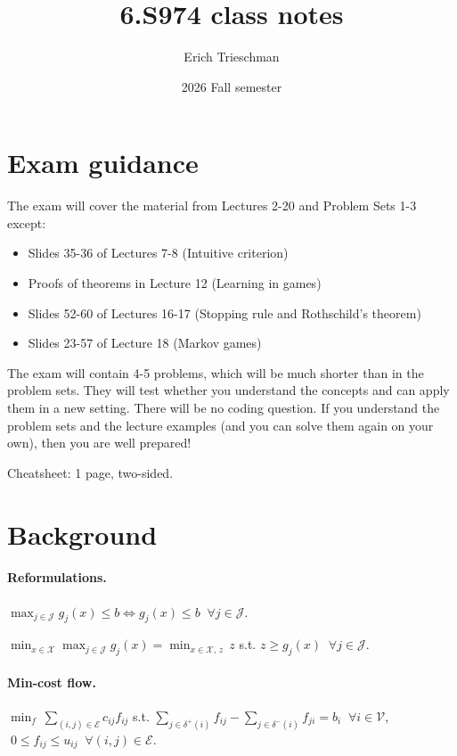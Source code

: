 \documentclass{article}
\title{6.S974 class notes}
\author{Erich Trieschman}
\date{2026 Fall semester}
\begin{document}
\maketitle
\tableofcontents

\section*{Exam guidance}
The exam will cover the material from Lectures 2-20 and Problem Sets 1-3 except:
\begin{itemize}
    \item Slides 35-36 of Lectures 7-8 (Intuitive criterion)
    \item Proofs of theorems in Lecture 12 (Learning in games)
    \item Slides 52-60 of Lectures 16-17 (Stopping rule and Rothschild's theorem)
    \item Slides 23-57 of Lecture 18 (Markov games)
\end{itemize}
The exam will contain 4-5 problems, which will be much shorter than in the problem sets. They will test whether you understand the concepts and can apply them in a new setting. There will be no coding question. If you understand the problem sets and the lecture examples (and you can solve them again on your own), then you are well prepared!

Cheatsheet: 1 page, two-sided.

\section{Background}

\paragraph{Reformulations.}
$\max_{j\in\mathcal J} g_j(x)\le b \iff g_j(x)\le b\;\;\forall j\in\mathcal J$.

$\min_{x\in\mathcal X}\max_{j\in\mathcal J} g_j(x)=\min_{x\in\mathcal X,\,z}\, z$ s.t. $z\ge g_j(x)\;\;\forall j\in\mathcal J$.

\paragraph{Min-cost flow.}
$\min_{f}\ \sum_{(i,j)\in\mathcal E} c_{ij}f_{ij}$ s.t. $\sum_{j\in\delta^+(i)} f_{ij}-\sum_{j\in\delta^-(i)} f_{ji}=b_i\;\;\forall i\in\mathcal V$, $\;0\le f_{ij}\le u_{ij}\;\;\forall (i,j)\in\mathcal E$.
\end{document}
